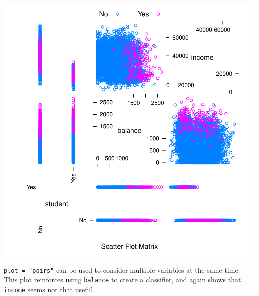 \documentclass[]{report}
\newenvironment{Shaded}{\begin{snugshade}}{\end{snugshade}}
\newcommand{\KeywordTok}[1]{\textcolor[rgb]{0.13,0.29,0.53}{\textbf{#1}}}
\newcommand{\DataTypeTok}[1]{\textcolor[rgb]{0.13,0.29,0.53}{#1}}
\newcommand{\DecValTok}[1]{\textcolor[rgb]{0.00,0.00,0.81}{#1}}
\newcommand{\StringTok}[1]{\textcolor[rgb]{0.31,0.60,0.02}{#1}}
\newcommand{\OperatorTok}[1]{\textcolor[rgb]{0.81,0.36,0.00}{\textbf{#1}}}
\newcommand{\NormalTok}[1]{#1}
\begin{document}
\includegraphics{MyBook_files/figure-latex/unnamed-chunk-117-1.pdf}

\texttt{plot\ =\ "pairs"} can be used to consider multiple variables at
the same time. This plot reinforces using \texttt{balance} to create a
classifier, and again shows that \texttt{income} seems not that useful.

\begin{Shaded}
\end{Shaded}
\end{document}
